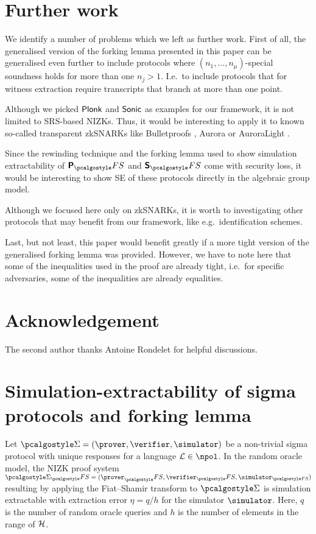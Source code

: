 \documentclass[runningheads,11pt]{llncs}
\begin{document}
\section{Further work}
We identify a number of problems which we left as further work. First of all,
the generalised version of the forking lemma presented in this paper can be
generalised even further to include protocols where $(n_1, \ldots,
n_\mu)$-special soundness holds for more than one $n_j > 1$. I.e.~to include
protocols that for witness extraction require transcripts that branch at more
than one point.

Although we picked $\textnormal{\textsf{Plonk}}$ and ${\textnormal{\textsf{Sonic}}}$ as examples for our framework, it is
not limited to SRS-based NIZKs. Thus, it would be interesting to apply it to
known so-called transparent zkSNARKs like Bulletproofs \cite{SP:BBBPWM18},
Aurora \cite{EC:BCRSVW19} or AuroraLight \cite{EPRINT:Gabizon19a}.

Since the rewinding technique and the forking lemma used to show simulation
extractability of $\plonkprotfs$ and $\sonicprotfs$ come with security loss,
it would be interesting to show SE of these protocols directly in the
algebraic group model.

Although we focused here only on zkSNARKs, it is worth to
investigating other protocols that may benefit from our framework, like
e.g.~identification schemes.

Last, but not least, this paper would benefit greatly if a more tight version
of the generalised forking lemma was provided. However, we have to note here
that some of the inequalities used in the proof are already tight, i.e.~for
specific adversaries, some of the inequalities are already equalities.

\section*{Acknowledgement}
The second author thanks Antoine Rondelet for helpful discussions.



\appendix

\section{Simulation-extractability of sigma protocols and forking lemma}
\label{sec:forking_lemma}
\begin{theorem}
	Let $\sigmaprot = (\prover, \verifier, \simulator)$ be a non-trivial sigma
  protocol with unique responses for a language $\LANG \in \npol$. In the random
  oracle model, the NIZK proof system $\sigmaprot_\fs = (\prover_\fs,
  \verifier_\fs, \simulator_{\fs})$ resulting by applying the Fiat--Shamir
  transform to $\sigmaprot$ is simulation extractable with extraction error
  $\eta = q/h$ for the simulator $\simulator$. Here, $q$ is the number of random
  oracle queries and $h$ is the number of elements in the range of $\mathcal{H}$.
\end{theorem}
\end{document}
